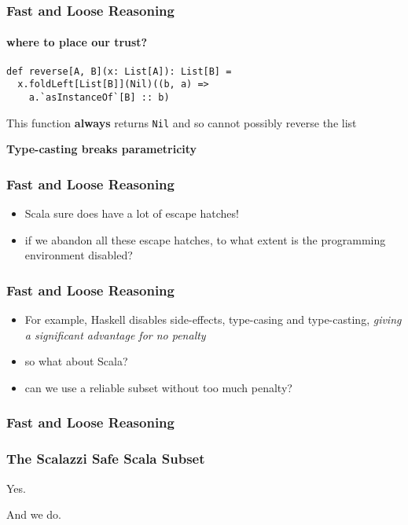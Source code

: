 \begin{frame}[fragile]
\frametitle{Fast and Loose Reasoning}
\framesubtitle{where to place our trust?}
\begin{lstlisting}[style=scala]
def reverse[A, B](x: List[A]): List[B] = 
  x.foldLeft[List[B]](Nil)((b, a) =>
    a.`asInstanceOf`[B] :: b)
\end{lstlisting}
\begin{theorem}This function \textbf{always} returns \lstinline{Nil} and so cannot possibly reverse the list\end{theorem}
\textbf{Type-casting breaks parametricity}
\end{frame}

\begin{frame}[fragile]
\frametitle{Fast and Loose Reasoning}
\begin{itemize}
  \item Scala sure does have a lot of escape hatches!
  \item if we abandon all these escape hatches, to what extent is the programming environment disabled?
\end{itemize}
\end{frame}

\begin{frame}[fragile]
\frametitle{Fast and Loose Reasoning}
\begin{itemize}
  \item For example, Haskell disables side-effects, type-casing and type-casting, \emph{giving a significant advantage for no penalty}
  \item so what about Scala?
  \item can we use a reliable subset without too much penalty?
\end{itemize}
\end{frame}

\begin{frame}[fragile]
\frametitle{Fast and Loose Reasoning}
\frametitle{The Scalazzi Safe Scala Subset}
\begin{center}
Yes.
\end{center}
\begin{center}
And we do.
\end{center}
\end{frame}

